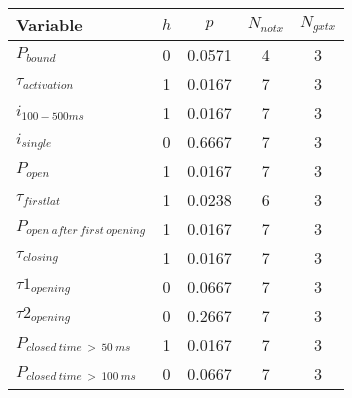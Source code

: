 \documentclass[7pt,oneside,letterpaper,landscape]{article}
\begin{document}
\begin{table}[!htbp]
\begin{flushright}
\begin{tabular} {| l | c | c | c | c |}
\hline
	{Variable} 							& {$h$}	& {$p$} 	& {$N_{notx}$} 	& {$N_{gxtx}$}	\\ 	\hline
	  
	$P_{bound}$							& 0 	& 0.0571	& 4 			& 3	\\ \hline
	$\tau_{activation}$					& 1 	& 0.0167	& 7 			& 3	\\ \hline
	$i_{100 - 500 ms}$					& 1 	& 0.0167	& 7 			& 3	\\ \hline
	$i_{single}$						& 0 	& 0.6667	& 7 			& 3	\\ \hline
	$P_{open}$							& 1 	& 0.0167	& 7 			& 3	\\ \hline
	
	$\tau_{first lat}$					& 1 	& 0.0238	& 6 			& 3	\\ \hline
	$P_{open\ after\ first\ opening}$	& 1 	& 0.0167	& 7 			& 3	\\ \hline
	$\tau_{closing}$					& 1 	& 0.0167	& 7 			& 3	\\ \hline
	$\tau1_{opening}$					& 0 	& 0.0667	& 7 			& 3	\\ \hline
	$\tau2_{opening}$					& 0 	& 0.2667	& 7 			& 3	\\ \hline
	$P_{closed\ time\ >\ 50\ ms}$		& 1 	& 0.0167	& 7 			& 3	\\ \hline
	$P_{closed\ time\ >\ 100\ ms}$		& 0 	& 0.0667	& 7 			& 3	\\ \hline
	
\end{tabular}
\end{flushright}
\end{table}
\end{document}
